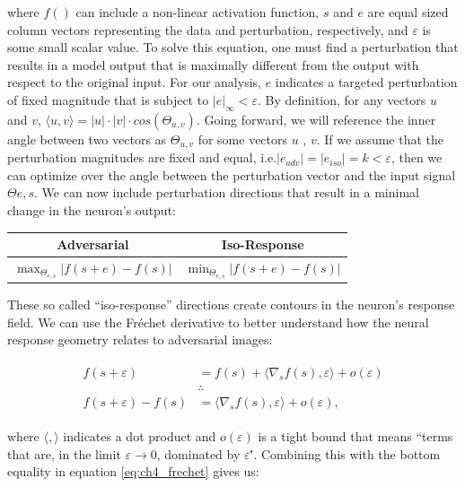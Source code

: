 where $f()$ can include a non-linear activation function, $s$ and $e$ are equal sized column vectors representing the data and perturbation, respectively, and $\varepsilon$ is some small scalar value. To solve this equation, one must find a perturbation that results in a model output that is maximally different from the output with respect to the original input. For our analysis, $e$ indicates a targeted perturbation of fixed magnitude that is subject to $|e|_{\infty}<\varepsilon$. By definition, for any vectors $u$ and $v$, $\langle u,v\rangle = |u| \cdot |v| \cdot cos(\Theta_{u,v})$. Going forward, we will reference the inner angle between two vectors as $\Theta_{u,v}$ for some vectors $u$ , $v$. If we assume that the perturbation magnitudes are fixed and equal, i.e.$|e_{adv}| = |e_{iso}| = k < \varepsilon$, then we can optimize over the angle between the perturbation vector and the input signal $\Theta{e,s}$. We can now include perturbation directions that result in a minimal change in the neuron's output:

\begin{center}
    \begin{tabular}{ |c | c| } \hline
     \textbf{Adversarial} & \textbf{Iso-Response} \\ \hline
     $\max_{\Theta_{e,s}}|f(s+e) - f(s)|$ & $\min_{\Theta_{e,s}} | f(s+e) - f(s) |$ \\ \hline
    \end{tabular}
\end{center}

These so called ``iso-response'' directions create contours in the neuron's response field. We can use the Fr\'{e}chet derivative to better understand how the neural response geometry relates to adversarial images:

\begin{align}\label{eq:ch4_frechet}
\begin{split}
    f(s+\varepsilon) &= f(s) + \langle\nabla_{s}f(s), \varepsilon\rangle + o(\varepsilon)\\
    &\therefore \\
    f(s+\varepsilon) - f(s) &= \langle\nabla_{s}f(s), \varepsilon\rangle+ o(\varepsilon),
\end{split}
\end{align}

where $\langle , \rangle$ indicates a dot product and $o(\varepsilon)$ is a tight bound that means ``terms that are, in the limit $\varepsilon \rightarrow 0$, dominated by $\varepsilon$\''. Combining this with the bottom equality in equation \eqref{eq:ch4_frechet} gives us:


